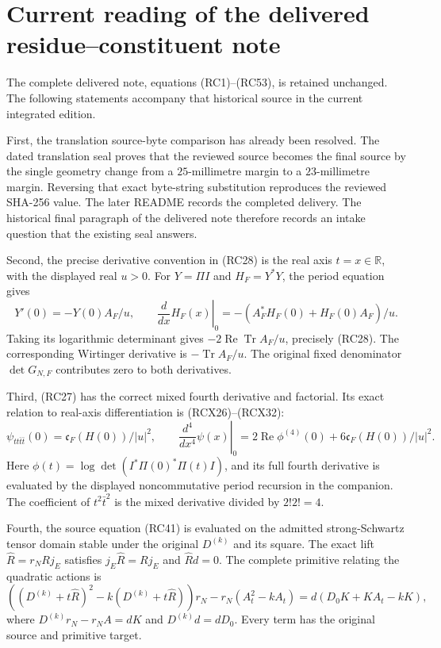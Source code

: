 \section{Current reading of the delivered residue--constituent note}

The complete delivered note, equations (RC1)--(RC53), is retained
unchanged. The following statements accompany that historical source
in the current integrated edition.

First, the translation source-byte comparison has already been resolved.
The dated translation seal proves that the reviewed source becomes the
final source by the single geometry change from a \(25\)-millimetre
margin to a \(23\)-millimetre margin. Reversing that exact byte-string
substitution reproduces the reviewed SHA-256 value. The later README
records the completed delivery. The historical final paragraph of the
delivered note therefore records an intake question that the existing
seal answers.

Second, the precise derivative convention in (RC28) is the real
axis \(t=x\in\mathbb R\), with the displayed real \(u>0\).
For \(Y=\Pi I\) and \(H_F=Y^*Y\), the period equation gives
\[
 Y'(0)=-Y(0)A_F/u,\qquad
 \left.\frac{d}{dx}H_F(x)\right|_0
       =-(A_F^*H_F(0)+H_F(0)A_F)/u.
\]
Taking its logarithmic determinant gives
\(-2\operatorname{Re}\operatorname{Tr}A_F/u\), precisely (RC28).
The corresponding Wirtinger derivative is
\(-\operatorname{Tr}A_F/u\). The original fixed denominator
\(\det G_{N,F}\) contributes zero to both derivatives.

Third, (RC27) has the correct mixed fourth derivative and factorial.
Its exact relation to real-axis differentiation is (RCX26)--(RCX32):
\[
 \psi_{tt\bar t\bar t}(0)=\mathfrak c_F(H(0))/|u|^2,\qquad
 \left.\frac{d^4}{dx^4}\psi(x)\right|_0
   =2\operatorname{Re}\phi^{(4)}(0)
      +6\mathfrak c_F(H(0))/|u|^2 .
\]
Here \(\phi(t)=\log\det(I^*\Pi(0)^*\Pi(t)I)\), and its full
fourth derivative is evaluated by the displayed noncommutative
period recursion in the companion. The coefficient of
\(t^2\bar t^2\) is the mixed derivative divided by \(2!2!=4\).

Fourth, the source equation (RC41) is evaluated on the admitted
strong-Schwartz tensor domain stable under the original
\(D^{(k)}\) and its square. The exact lift
\(\widehat R=r_NRj_E\) satisfies
\(j_E\widehat R=Rj_E\) and \(\widehat R d=0\).
The complete primitive relating the quadratic actions is
\[
 ((D^{(k)}+t\widehat R)^2-k(D^{(k)}+t\widehat R))r_N
     -r_N(A_t^2-kA_t)
       =d(D_0K+KA_t-kK),
\]
where \(D^{(k)}r_N-r_NA=dK\) and \(D^{(k)}d=dD_0\).
Every term has the original source and primitive target.

